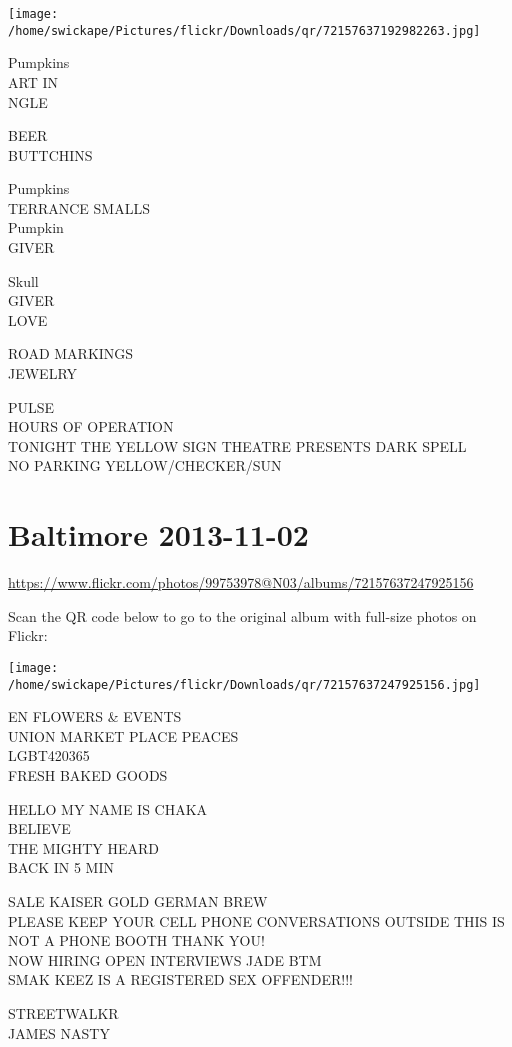 \documentclass[10pt,letterpaper]{article}
\begin{document}
\texttt{[image: /home/swickape/Pictures/flickr/Downloads/qr/72157637192982263.jpg]}
\pagebreak

Pumpkins\\
ART IN\\
NGLE

BEER\\
BUTTCHINS

Pumpkins\\
TERRANCE SMALLS\\
Pumpkin\\
GIVER

Skull\\
GIVER\\
LOVE

ROAD MARKINGS\\
JEWELRY

PULSE\\
HOURS OF OPERATION\\
TONIGHT THE YELLOW SIGN THEATRE PRESENTS DARK SPELL\\
NO PARKING YELLOW/CHECKER/SUN
\pagebreak

\section*{Baltimore 2013-11-02}

\url{https://www.flickr.com/photos/99753978@N03/albums/72157637247925156}

Scan the QR code below to go to the original album with full-size photos on Flickr:

\texttt{[image: /home/swickape/Pictures/flickr/Downloads/qr/72157637247925156.jpg]}
\pagebreak

EN FLOWERS \& EVENTS\\
UNION MARKET PLACE PEACES\\
LGBT420365\\
FRESH BAKED GOODS

HELLO MY NAME IS CHAKA\\
BELIEVE\\
THE MIGHTY HEARD\\
BACK IN 5 MIN

SALE KAISER GOLD GERMAN BREW\\
PLEASE KEEP YOUR CELL PHONE CONVERSATIONS OUTSIDE THIS IS NOT A PHONE BOOTH THANK YOU!\\
NOW HIRING OPEN INTERVIEWS JADE BTM\\
SMAK KEEZ IS A REGISTERED SEX OFFENDER!!!

STREETWALKR\\
JAMES NASTY
\end{document}
